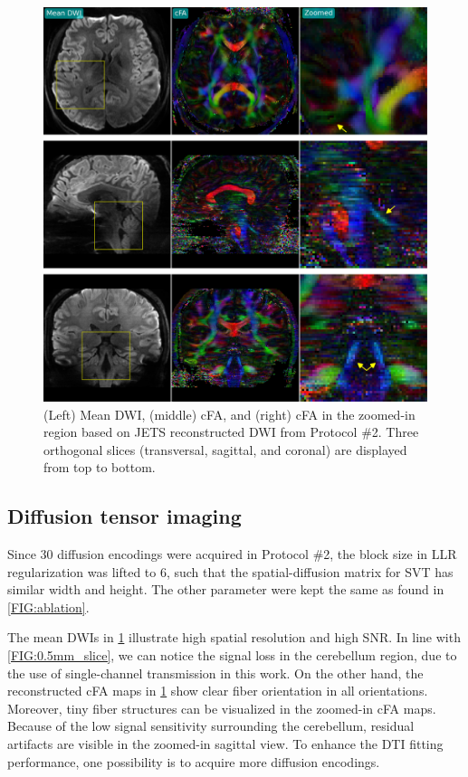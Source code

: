 \documentclass[preprint,12pt,authoryear,review]{elsarticle}
\begin{document}
    \begin{figure}
        \centering
        \includegraphics[width=\textwidth]{../figures/fig9.png}
        \caption{(Left) Mean DWI, (middle) cFA, and
        (right) cFA in the zoomed-in region
        based on JETS reconstructed DWI from Protocol \#2.
        Three orthogonal slices (transversal, sagittal, and coronal)
        are displayed from top to bottom.}
        \label{FIG:1.0mm_dti}
    \end{figure}

    \subsection{Diffusion tensor imaging}

    Since 30 diffusion encodings were acquired in Protocol \#2,
    the block size in LLR regularization was lifted to $6$,
    such that the spatial-diffusion matrix for SVT
    has similar width and height.
    The other parameter were kept the same as found in \cref{FIG:ablation}.

    The mean DWIs in \cref{FIG:1.0mm_dti} illustrate
    high spatial resolution and high SNR.
    In line with \cref{FIG:0.5mm_slice},
    we can notice the signal loss in the cerebellum region,
    due to the use of single-channel transmission in this work.
    On the other hand, the reconstructed cFA maps in \cref{FIG:1.0mm_dti}
    show clear fiber orientation in all orientations.
    Moreover, tiny fiber structures can be visualized
    in the zoomed-in cFA maps.
    Because of the low signal sensitivity surrounding the cerebellum,
    residual artifacts are visible in the zoomed-in sagittal view.
    To enhance the DTI fitting performance, one possibility is to
    acquire more diffusion encodings.
\end{document}
